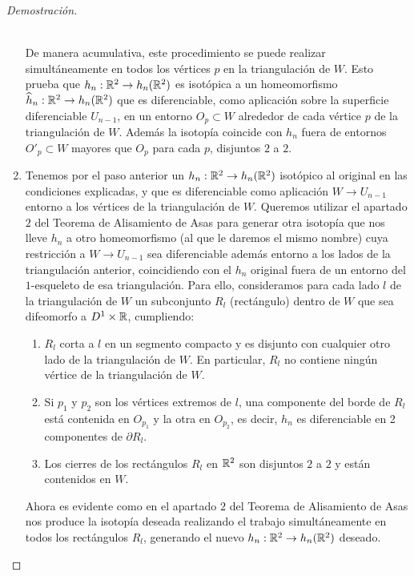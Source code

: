 \begin{proof}[Demostración]
\begin{enumerate}
			\\ De manera acumulativa, este procedimiento se puede realizar simultáneamente en todos los vértices $p$ en la triangulación de $W$. Esto prueba que $h_n: \mathbb{R}^2 \rightarrow h_n(\mathbb{R}^2)$ es isotópica a un homeomorfismo $\widehat{h}_n: \mathbb{R}^2 \rightarrow h_n(\mathbb{R}^2)$ que es diferenciable, como aplicación sobre la superficie diferenciable $U_{n-1}$, en un entorno $O_p \subset W$ alrededor de cada vértice $p$ de la triangulación de $W$. Además la isotopía coincide con $h_n$ fuera de entornos $O'_p \subset W$ mayores que $O_p$ para cada $p$, disjuntos $2$ a $2$.\\

			\item Tenemos por el paso anterior un $h_n: \mathbb{R}^2 \rightarrow h_n(\mathbb{R}^2)$ isotópico al original en las condiciones explicadas, y que es diferenciable como aplicación $W \rightarrow U_{n-1}$ entorno a los vértices de la triangulación de $W$. Queremos utilizar el apartado $2$ del Teorema de Alisamiento de Asas para generar otra isotopía que nos lleve $h_n$ a otro homeomorfismo (al que le daremos el mismo nombre) cuya restricción a $W \rightarrow U_{n-1}$ sea diferenciable además entorno a los lados de la triangulación anterior, coincidiendo con el $h_n$ original fuera de un entorno del $1$-esqueleto de esa triangulación. Para ello, consideramos para cada lado $l$ de la triangulación de $W$ un subconjunto $R_l$ (rectángulo) dentro de $W$ que sea difeomorfo a $D^1 \times \mathbb{R}$, cumpliendo:
				\begin{enumerate}
					\item $R_l$ corta a $l$ en un segmento compacto y es disjunto con cualquier otro lado de la triangulación de $W$. En particular, $R_l$ no contiene ningún vértice de la triangulación de $W$.
					\item Si $p_1$ y $p_2$ son los vértices extremos de $l$, una componente del borde de $R_l$ está contenida en $O_{p_1}$ y la otra en $O_{p_2}$, es decir, $h_n$ es diferenciable en 2 componentes de $\partial R_l$.
					\item Los cierres de los rectángulos $R_l$ en $\mathbb{R}^2$ son disjuntos $2$ a $2$ y están contenidos en $W$.
				\end{enumerate}

			Ahora es evidente como en el apartado $2$ del Teorema de Alisamiento de Asas nos produce la isotopía deseada realizando el trabajo simultáneamente en todos los rectángulos $R_l$, generando el nuevo $h_n:\mathbb{R}^2 \rightarrow h_n(\mathbb{R}^2)$ deseado.\\


\end{enumerate}
\end{proof}
